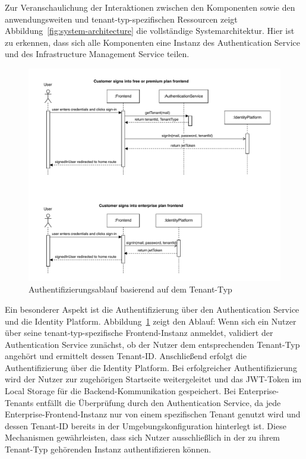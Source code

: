 Zur Veranschaulichung der Interaktionen zwischen den Komponenten sowie den anwendungsweiten und tenant-typ-spezifischen Ressourcen zeigt Abbildung~\ref{fig:system-architecture} die vollständige Systemarchitektur. Hier ist zu erkennen, dass sich alle Komponenten eine Instanz des Authentication Service und des Infrastructure Management Service teilen.

\begin{figure}[H]
	\centering
	\includegraphics[width=\textwidth]{resources/03-runtime-view/pdf/authentication-sequence.pdf}
	\caption{Authentifizierungsablauf basierend auf dem Tenant-Typ}
	\label{fig:authentication-sequence}
\end{figure}

Ein besonderer Aspekt ist die Authentifizierung über den Authentication Service und die Identity Platform. Abbildung~\ref{fig:authentication-sequence} zeigt den Ablauf:
Wenn sich ein Nutzer über seine tenant-typ-spezifische Frontend-Instanz anmeldet, validiert der Authentication Service zunächst, ob der Nutzer dem entsprechenden Tenant-Typ angehört und ermittelt dessen Tenant-ID. Anschließend erfolgt die Authentifizierung über die Identity Platform. Bei erfolgreicher Authentifizierung wird der Nutzer zur zugehörigen Startseite weitergeleitet und das JWT-Token im Local Storage für die Backend-Kommunikation gespeichert.
Bei Enterprise-Tenants entfällt die Überprüfung durch den Authentication Service, da jede Enterprise-Frontend-Instanz nur von einem spezifischen Tenant genutzt wird und dessen Tenant-ID bereits in der Umgebungskonfiguration hinterlegt ist. Diese Mechanismen gewährleisten, dass sich Nutzer ausschließlich in der zu ihrem Tenant-Typ gehörenden Instanz authentifizieren können.

